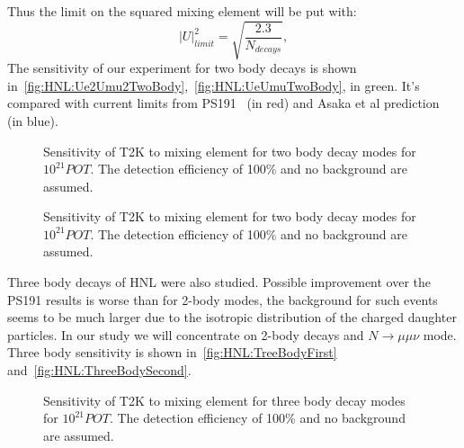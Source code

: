 \documentclass[../main.tex]{subfiles}
\begin{document}
Thus the limit on the squared mixing element will be put with:
\begin{equation}
    \left|U\right|^2_{limit}=\sqrt{\frac{2.3}{N_{decays}}},
\end{equation}
The sensitivity of our experiment for two body decays is shown in~\autoref{fig:HNL:Ue2Umu2TwoBody},~\autoref{fig:HNL:UeUmuTwoBody}, in green. It's compared with current limits from PS191~\cite{Bernardi1988} (in red) and Asaka et al prediction~\cite{Asaka2012} (in blue).
\begin{figure}[!ht]
    \begin{minipage}[!ht]{0.49\linewidth}
    \end{minipage}
    \hfill
    \begin{minipage}[!ht]{0.49\linewidth}
    \end{minipage}
    \caption{Sensitivity of T2K to mixing element for two body decay modes for $10^{21}POT$. The detection efficiency of 100\% and no background are assumed.}
    \label{fig:HNL:Ue2Umu2TwoBody}
\end{figure}

\begin{figure}[!ht]
    \caption{Sensitivity of T2K to mixing element for two body decay modes for $10^{21}POT$. The detection efficiency of 100\% and no background are assumed.}
    \label{fig:HNL:UeUmuTwoBody}
\end{figure}

Three body decays of HNL were also studied. Possible improvement over the PS191 results is worse than for 2-body modes, the background for such events seems to be much larger due to the isotropic distribution of the charged daughter particles. In our study we will concentrate on 2-body decays and $N\to\mu\mu\nu$ mode. Three body sensitivity is shown in~\autoref{fig:HNL:TreeBodyFirst} and~\autoref{fig:HNL:ThreeBodySecond}.

\begin{figure}[!ht]
    \begin{minipage}[!ht]{0.49\linewidth}
    \end{minipage}
    \hfill
    \begin{minipage}[!ht]{0.49\linewidth}
    \end{minipage}
    \caption{Sensitivity of T2K to mixing element for three body decay modes for $10^{21}POT$. The detection efficiency of 100\% and no background are assumed.}
    \label{fig:HNL:TreeBodyFirst}
\end{figure}
\end{document}
